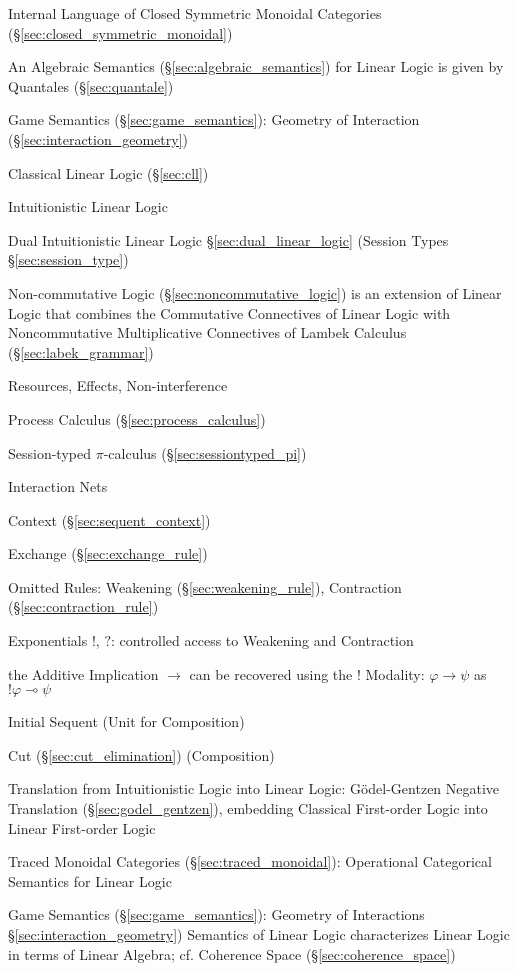 \asterism


Internal Language of Closed Symmetric Monoidal Categories
(\S\ref{sec:closed_symmetric_monoidal})

An Algebraic Semantics (\S\ref{sec:algebraic_semantics}) for Linear
Logic is given by Quantales (\S\ref{sec:quantale})

Game Semantics (\S\ref{sec:game_semantics}): Geometry of Interaction
(\S\ref{sec:interaction_geometry})

Classical Linear Logic (\S\ref{sec:cll})

Intuitionistic Linear Logic

Dual Intuitionistic Linear Logic \S\ref{sec:dual_linear_logic}
(Session Types \S\ref{sec:session_type}) \cite{caires-pfenning10}

\fist Non-commutative Logic (\S\ref{sec:noncommutative_logic}) is an
extension of Linear Logic that combines the Commutative Connectives of
Linear Logic with Noncommutative Multiplicative Connectives of Lambek
Calculus (\S\ref{sec:labek_grammar})

Resources, Effects, Non-interference \cite{caires-pfenning10}

Process Calculus (\S\ref{sec:process_calculus})

Session-typed $\pi$-calculus (\S\ref{sec:sessiontyped_pi})

Interaction Nets %

Context (\S\ref{sec:sequent_context})

Exchange (\S\ref{sec:exchange_rule})

Omitted Rules: Weakening (\S\ref{sec:weakening_rule}), Contraction
(\S\ref{sec:contraction_rule})

Exponentials $!$, $?$: controlled access to Weakening and Contraction

the Additive Implication $\rightarrow$ can be recovered using the $!$
Modality: $\varphi \rightarrow \psi$ as $!\varphi \multimap \psi$

Initial Sequent (Unit for Composition)

Cut (\S\ref{sec:cut_elimination}) (Composition)

Translation from Intuitionistic Logic into Linear Logic:
G\"odel-Gentzen Negative Translation (\S\ref{sec:godel_gentzen}),
embedding Classical First-order Logic into Linear First-order Logic

Traced Monoidal Categories (\S\ref{sec:traced_monoidal}): Operational
Categorical Semantics for Linear Logic

Game Semantics (\S\ref{sec:game_semantics}): Geometry of Interactions
\S\ref{sec:interaction_geometry}) Semantics of Linear Logic
characterizes Linear Logic in terms of Linear Algebra; cf. Coherence
Space (\S\ref{sec:coherence_space})

